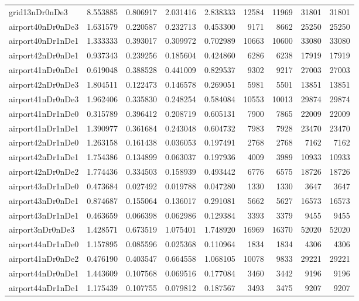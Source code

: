 \begin{longtable}{|l|r|r|r|r|r|r|r|r|}
grid13nDr0nDe3 & 8.553885 & 0.806917 & 2.031416 & 2.838333 & 12584 & 11969 & 31801 & 31801 \\
airport40nDr0nDe3 & 1.631579 & 0.220587 & 0.232713 & 0.453300 & 9171 & 8662 & 25250 & 25250 \\
airport40nDr1nDe1 & 1.333333 & 0.393017 & 0.309972 & 0.702989 & 10663 & 10600 & 33080 & 33080 \\
airport42nDr0nDe1 & 0.937343 & 0.239256 & 0.185604 & 0.424860 & 6286 & 6238 & 17919 & 17919 \\
airport41nDr0nDe1 & 0.619048 & 0.388528 & 0.441009 & 0.829537 & 9302 & 9217 & 27003 & 27003 \\
airport42nDr0nDe3 & 1.804511 & 0.122473 & 0.146578 & 0.269051 & 5981 & 5501 & 13851 & 13851 \\
airport41nDr0nDe3 & 1.962406 & 0.335830 & 0.248254 & 0.584084 & 10553 & 10013 & 29874 & 29874 \\
airport41nDr1nDe0 & 0.315789 & 0.396412 & 0.208719 & 0.605131 & 7900 & 7865 & 22009 & 22009 \\
airport41nDr1nDe1 & 1.390977 & 0.361684 & 0.243048 & 0.604732 & 7983 & 7928 & 23470 & 23470 \\
airport42nDr1nDe0 & 1.263158 & 0.161438 & 0.036053 & 0.197491 & 2768 & 2768 & 7162 & 7162 \\
airport42nDr1nDe1 & 1.754386 & 0.134899 & 0.063037 & 0.197936 & 4009 & 3989 & 10933 & 10933 \\
airport42nDr0nDe2 & 1.774436 & 0.334503 & 0.158939 & 0.493442 & 6776 & 6575 & 18726 & 18726 \\
airport43nDr1nDe0 & 0.473684 & 0.027492 & 0.019788 & 0.047280 & 1330 & 1330 & 3647 & 3647 \\
airport43nDr0nDe1 & 0.874687 & 0.155064 & 0.136017 & 0.291081 & 5662 & 5627 & 16573 & 16573 \\
airport43nDr1nDe1 & 0.463659 & 0.066398 & 0.062986 & 0.129384 & 3393 & 3379 & 9455 & 9455 \\
airport3nDr0nDe3 & 1.428571 & 0.673519 & 1.075401 & 1.748920 & 16969 & 16370 & 52020 & 52020 \\
airport44nDr1nDe0 & 1.157895 & 0.085596 & 0.025368 & 0.110964 & 1834 & 1834 & 4306 & 4306 \\
airport41nDr0nDe2 & 0.476190 & 0.403547 & 0.664558 & 1.068105 & 10078 & 9833 & 29221 & 29221 \\
airport44nDr0nDe1 & 1.443609 & 0.107568 & 0.069516 & 0.177084 & 3460 & 3442 & 9196 & 9196 \\
airport44nDr1nDe1 & 1.175439 & 0.107755 & 0.079812 & 0.187567 & 3493 & 3475 & 9207 & 9207 \\

\end{longtable}
